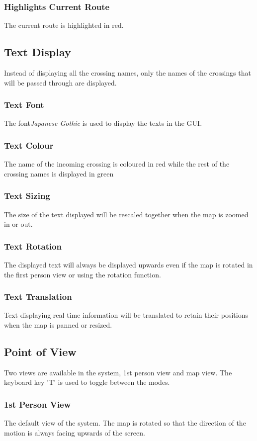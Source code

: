 \documentclass[12pt]{article}
\begin{document}
\subsubsection{Highlights Current Route}
The current route is highlighted in red.
\subsection{Text Display}
Instead of displaying all the crossing names, only the names of the crossings that will be passed through are displayed.
\subsubsection{Text Font}
The font{\it Japanese Gothic} is used to display the texts in the GUI.
\subsubsection{Text Colour}
The name of the incoming crossing is coloured in red while the rest of the crossing names is displayed in green
\subsubsection{Text Sizing}
The size of the text displayed will be rescaled together when the map is zoomed in or out.
\subsubsection{Text Rotation}
The displayed text will always be displayed upwards even if the map is rotated in the first person view or using the rotation function.
\subsubsection{Text Translation}
Text displaying real time information will be translated to retain their positions when the map is panned or resized.
\subsection{Point of View}
Two views are available in the system, 1st person view and map view. The keyboard key 'T' is used to toggle between the modes. 
\subsubsection{1st Person View}
The default view of the system. The map is rotated so that the direction of the motion is always facing upwards of the screen.
\end{document}
